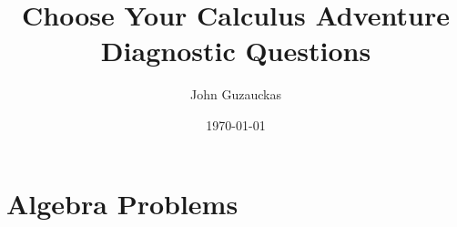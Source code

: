 \documentclass{article}
\title{Choose Your Calculus Adventure \\
        Diagnostic Questions}
\author{John Guzauckas}
\date{\today}
\begin{document}
\maketitle

\section{Algebra Problems}
\end{document}
